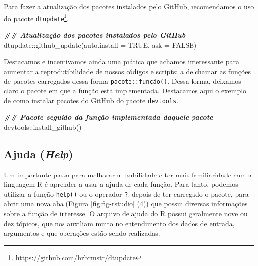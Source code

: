 \documentclass[
]{book}
\newenvironment{Shaded}{\begin{snugshade}}{\end{snugshade}}
\newcommand{\AttributeTok}[1]{\textcolor[rgb]{0.61,0.61,0.61}{#1}}
\newcommand{\ConstantTok}[1]{\textcolor[rgb]{0,0,0}{#1}}
\newcommand{\DocumentationTok}[1]{\textcolor[rgb]{0.37,0.37,0.37}{\textbf{\textit{#1}}}}
\newcommand{\FunctionTok}[1]{\textcolor[rgb]{0,0,0}{#1}}
\newcommand{\NormalTok}[1]{#1}
\newcommand{\SpecialCharTok}[1]{\textcolor[rgb]{0,0,0}{#1}}
\renewcommand{\href}[2]{#2\footnote{\url{#1}}}
\begin{document}
Para fazer a atualização dos pacotes instalados pelo GitHub, recomendamos o uso do pacote \href{https://github.com/hrbrmstr/dtupdate}{\texttt{dtupdate}}.

\begin{Shaded}
\begin{Highlighting}[]
\DocumentationTok{\#\# Atualização dos pacotes instalados pelo GitHub}
\NormalTok{dtupdate}\SpecialCharTok{::}\FunctionTok{github\_update}\NormalTok{(}\AttributeTok{auto.install =} \ConstantTok{TRUE}\NormalTok{, }\AttributeTok{ask =} \ConstantTok{FALSE}\NormalTok{)}
\end{Highlighting}
\end{Shaded}

Destacamos e incentivamos ainda uma prática que achamos interessante para aumentar a reprodutibilidade de nossos códigos e scripts: a de chamar as funções de pacotes carregados dessa forma \texttt{pacote::função()}. Dessa forma, deixamos claro o pacote em que a função está implementada. Destacamos aqui o exemplo de como instalar pacotes do GitHub do pacote \texttt{devtools}.

\begin{Shaded}
\begin{Highlighting}[]
\DocumentationTok{\#\# Pacote seguido da função implementada daquele pacote}
\NormalTok{devtools}\SpecialCharTok{::}\FunctionTok{install\_github}\NormalTok{()}
\end{Highlighting}
\end{Shaded}

\hypertarget{ajuda-help}{%
\subsection{\texorpdfstring{Ajuda (\emph{Help})}{Ajuda (Help)}}\label{ajuda-help}}

Um importante passo para melhorar a usabilidade e ter mais familiaridade com a linguagem R é aprender a usar a ajuda de cada função. Para tanto, podemos utilizar a função \texttt{help()} ou o operador \texttt{?}, depois de ter carregado o pacote, para abrir uma nova aba (Figura \ref{fig:fig-rstudio} (4)) que possui diversas informações sobre a função de interesse. O arquivo de ajuda do R possui geralmente nove ou dez tópicos, que nos auxiliam muito no entendimento dos dados de entrada, argumentos e que operações estão sendo realizadas.
\end{document}
